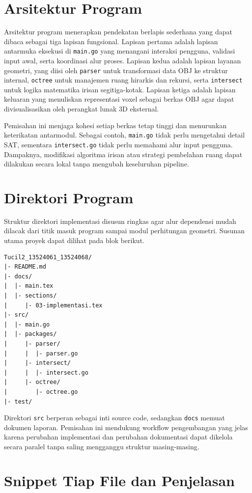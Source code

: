 \section{Arsitektur Program}
Arsitektur program menerapkan pendekatan berlapis sederhana yang dapat dibaca sebagai tiga lapisan fungsional. Lapisan pertama adalah lapisan antarmuka eksekusi di \texttt{main.go} yang menangani interaksi pengguna, validasi input awal, serta koordinasi alur proses. Lapisan kedua adalah lapisan layanan geometri, yang diisi oleh \texttt{parser} untuk transformasi data OBJ ke struktur internal, \texttt{octree} untuk manajemen ruang hirarkis dan rekursi, serta \texttt{intersect} untuk logika matematika irisan segitiga-kotak. Lapisan ketiga adalah lapisan keluaran yang menuliskan representasi voxel sebagai berkas OBJ agar dapat divisualisasikan oleh perangkat lunak 3D eksternal.

Pemisahan ini menjaga kohesi setiap berkas tetap tinggi dan menurunkan keterikatan antarmodul. Sebagai contoh, \texttt{main.go} tidak perlu mengetahui detail SAT, sementara \texttt{intersect.go} tidak perlu memahami alur input pengguna. Dampaknya, modifikasi algoritma irisan atau strategi pembelahan ruang dapat dilakukan secara lokal tanpa mengubah keseluruhan pipeline.

\section{Direktori Program}
Struktur direktori implementasi disusun ringkas agar alur dependensi mudah dilacak dari titik masuk program sampai modul perhitungan geometri. Susunan utama proyek dapat dilihat pada blok berikut.

\begin{verbatim}
Tucil2_13524061_13524068/
|- README.md
|- docs/
|  |- main.tex
|  |- sections/
|     |- 03-implementasi.tex
|- src/
|  |- main.go
|  |- packages/
|     |- parser/
|     |  |- parser.go
|     |- intersect/
|     |  |- intersect.go
|     |- octree/
|        |- octree.go
|- test/
\end{verbatim}

Direktori \texttt{src} berperan sebagai inti source code, sedangkan \texttt{docs} memuat dokumen laporan. Pemisahan ini mendukung workflow pengembangan yang jelas karena perubahan implementasi dan perubahan dokumentasi dapat dikelola secara paralel tanpa saling mengganggu struktur masing-masing.

\section{Snippet Tiap File dan Penjelasan}

